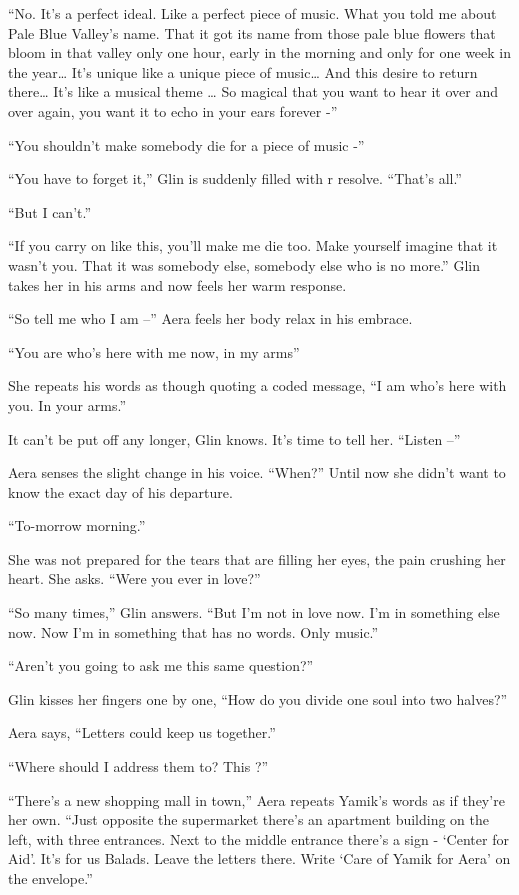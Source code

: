 \documentclass[twoside,11pt]{book}
\begin{document}
``No. It's a perfect ideal. Like a perfect piece of music. What you told me about Pale Blue Valley's name.
That it got its name from those pale blue flowers that bloom in that valley only one hour, early in the morning and
only for one week in the year{\dots} It's unique like a unique piece of music{\ldots} And this desire to return there{\dots}
It's like a musical theme {\dots} So magical that you want to hear it over and over again, you want it to echo in your
ears forever -''

``You shouldn't make somebody die for a piece of music -''

``You have to forget it,'' Glin is suddenly filled with r resolve. ``That's
all.''

``But I can't.''

``If you carry on like this, you'll make me die too. Make yourself
 imagine that it wasn't you. That it was somebody else, somebody else who is no more.'' Glin takes her
in his arms and now feels her warm response.

``So tell me who I am --'' Aera feels her body relax in his embrace.

``You are who's here with me now, in my arms''

She repeats his words as though quoting a coded message, ``I am who's here with you. In your
arms.''

It can't be put off any longer, Glin knows. It's time to tell her. ``Listen --''

Aera senses the slight change in his voice. ``When?'' Until now she didn't want to know the
exact day of his departure.

``To-morrow morning.''

She was not prepared for the tears that are filling her eyes, the pain crushing her heart. She asks. ``Were
you ever in love?''

``So many times,'' Glin answers. ``But I'm not in love now. I'm in something else
now. Now I'm in something that has no words. Only music.''

``Aren't you going to ask me this same question?''

Glin kisses her fingers one by one, ``How do you divide one soul into two halves?''

Aera says, ``Letters could keep us together.''

``Where should I address them to? This ?''

``There's a new shopping mall in town,'' Aera repeats Yamik's words as if they're her own.
``Just opposite the supermarket there's an apartment building on the left, with three entrances. Next to
the middle entrance there's a sign - `Center for Aid'. It's for us Balads. Leave the letters there. Write `Care of
Yamik for Aera' on the envelope.''
\end{document}
